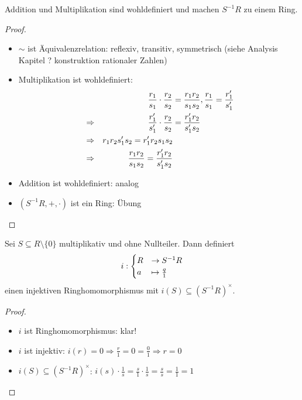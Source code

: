 \begin{lemma}
	Addition und Multiplikation sind wohldefiniert und machen $S^{-1}R$ zu einem Ring.
\end{lemma}

\begin{proof}
	\begin{itemize}
	\item $\sim$ ist Äquivalenzrelation: reflexiv, transitiv, symmetrisch (siehe Analysis Kapitel ? konstruktion rationaler Zahlen)
	\item Multiplikation ist wohldefiniert:
	\begin{align}
	& &\frac{r_1}{s_1} \cdot \frac{r_2}{s_2} &= \frac{r_1 r_2}{s_1 s_2}, \frac{r_1}{s_1} = \frac{r_1'}{s_1'}\notag \\
	&\Rightarrow &\frac{r_1'}{s_1'} \cdot \frac{r_2}{s_2} &= \frac{r_1' r_2}{s_1' s_2}\notag \\
	&\Rightarrow &r_1 r_2 s_1' s_2 = r_1' r_2 s_1 s_2\notag \\
	&\Rightarrow &\frac{r_1 r_2}{s_1 s_2} = \frac{r_1' r_2}{s_1' s_2}\notag
	\end{align}
	\item Addition ist wohldefiniert: analog
	\item $(S^{-1}R, + ,\cdot)$ ist ein Ring: Übung
	\end{itemize}
\end{proof}

\begin{proposition}
	Sei $S \subseteq R \setminus \{0\}$ multiplikativ und ohne Nullteiler. Dann definiert
	\begin{align}
		i: \begin{cases}
			R &\to S^{-1}R \\
			a &\mapsto \frac{q}{1}
		\end{cases}\notag
	\end{align}
	einen injektiven Ringhomomorphismus mit $i(S) \subseteq (S^{-1}R)^{\times}$.
\end{proposition}

\begin{proof}
	\begin{itemize}
	\item $i$ ist Ringhomomorphismus: klar!
	\item $i$ ist injektiv: $i(r) = 0 \Rightarrow \frac{r}{1} = 0 = \frac{0}{1} \Rightarrow r = 0$
	\item $i(S) \subseteq (S^{-1}R)^{\times}$: $i(s)\cdot \frac{1}{s} = \frac{s}{1} \cdot \frac{1}{s} = \frac{s}{s} = \frac{1}{1} = 1$
	\end{itemize}
\end{proof}

